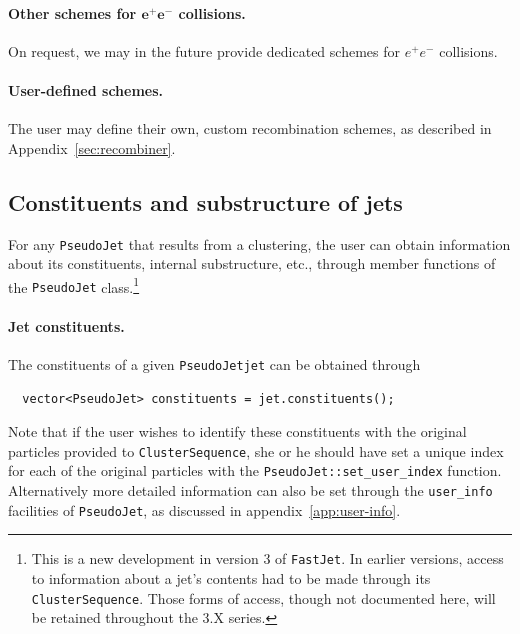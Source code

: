 \documentclass[12pt,a4]{article}
\newcommand{\fastjet}{\texttt{FastJet}\xspace}
\newcommand{\ttt}[1]{{\small\texttt{#1}}}
\newcommand{\ee}{e^+e^-}
\newcommand{\PseudoJet}{\ttt{PseudoJet}\xspace}
\newcommand{\CS}{\ttt{ClusterSequence}\xspace}
\begin{document}
\paragraph{Other schemes for $\boldsymbol{e^+e^-}$ collisions.}
On request, we may in the future provide dedicated schemes for $\ee$
collisions.

\paragraph{User-defined schemes.} The user may define their own,
custom recombination schemes, as described in Appendix~\ref{sec:recombiner}.





\subsection{Constituents and substructure of jets}
\label{sec:constituents}

For any \PseudoJet that results from a clustering, the user can
obtain information about its constituents, internal substructure,
etc., through  member functions of the \PseudoJet
class.\footnote{This is a new development in version 3 of
  \fastjet. In earlier versions, access to information about a jet's
  contents had to be made through its \CS. Those forms of access,
  though not documented here, will be retained throughout the 3.X
  series.}

\paragraph{Jet constituents.}
The constituents of a given \PseudoJet \verb|jet| can be
obtained through
\begin{lstlisting}
  vector<PseudoJet> constituents = jet.constituents();
\end{lstlisting}
%
Note that if the user wishes to identify these constituents with the
original particles provided to \ttt{ClusterSequence}, she or
he should have set a unique index for each of the original particles
with the \ttt{PseudoJet::set\_user\_index} function.
%
Alternatively more detailed information can also be set through the
\verb|user_info| facilities of \PseudoJet, as discussed in
appendix~\ref{app:user-info}.
\end{document}
